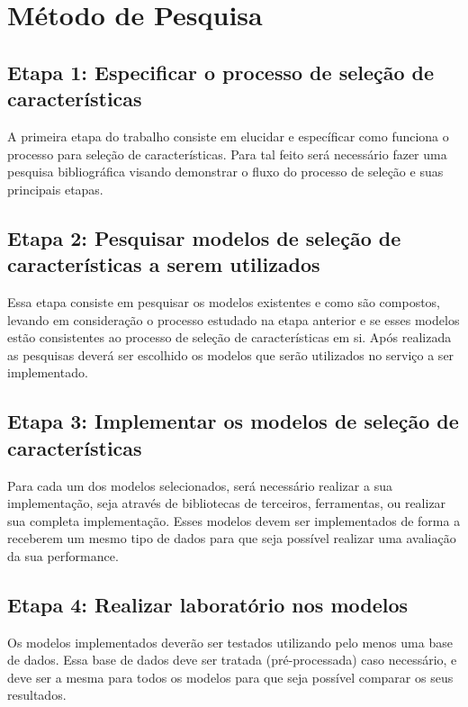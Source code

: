 \section{Método de Pesquisa}

\subsection{Etapa 1: Especificar o processo de seleção de características}

A primeira etapa do trabalho consiste em elucidar e específicar como funciona o processo para seleção de características. Para tal feito será necessário fazer uma pesquisa bibliográfica visando demonstrar o fluxo do processo de seleção e suas principais etapas.

\subsection{Etapa 2: Pesquisar modelos de seleção de características a serem utilizados}

Essa etapa consiste em pesquisar os modelos existentes e como são compostos, levando em consideração o processo estudado na etapa anterior e se esses modelos estão consistentes ao processo de seleção de características em si. Após realizada as pesquisas deverá ser escolhido os modelos que serão utilizados no serviço a ser implementado.

\subsection{Etapa 3: Implementar os modelos de seleção de características}

Para cada um dos modelos selecionados, será necessário realizar a sua implementação, seja através de bibliotecas de terceiros, ferramentas, ou realizar sua completa implementação. Esses modelos devem ser implementados de forma a receberem um mesmo tipo de dados para que seja possível realizar uma avaliação da sua performance.

\subsection{Etapa 4: Realizar laboratório nos modelos}

Os modelos implementados deverão ser testados utilizando pelo menos uma base de dados. Essa base de dados deve ser tratada (pré-processada) caso necessário, e deve ser a mesma para todos os modelos para que seja possível comparar os seus resultados.

